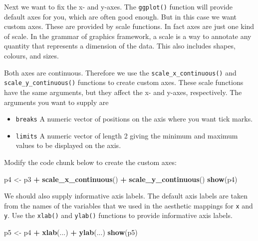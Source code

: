 \documentclass[
]{book}
\newenvironment{Shaded}{\begin{snugshade}}{\end{snugshade}}
\newcommand{\FunctionTok}[1]{\textcolor[rgb]{0.13,0.29,0.53}{\textbf{#1}}}
\newcommand{\NormalTok}[1]{#1}
\newcommand{\OtherTok}[1]{\textcolor[rgb]{0.56,0.35,0.01}{#1}}
\newcommand{\SpecialCharTok}[1]{\textcolor[rgb]{0.81,0.36,0.00}{\textbf{#1}}}
\providecommand{\tightlist}{%
  \setlength{\itemsep}{0pt}\setlength{\parskip}{0pt}}
\begin{document}
Next we want to fix the x- and y-axes. The \texttt{ggplot()} function will provide default axes for you, which are often good enough. But in this case we want custom axes. These are provided by scale functions. In fact axes are just one kind of scale. In the grammar of graphics framework, a scale is a way to annotate any quantity that represents a dimension of the data. This also includes shapes, colours, and sizes.

Both axes are continuous. Therefore we use the \texttt{scale\_x\_continuous()} and \texttt{scale\_y\_continuous()} functions to create custom axes. These scale functions have the same arguments, but they affect the x- and y-axes, respectively. The arguments you want to supply are

\begin{itemize}
\tightlist
\item
  \texttt{breaks} A numeric vector of positions on the axis where you want tick marks.
\item
  \texttt{limits} A numeric vector of length 2 giving the minimum and maximum values to be displayed on the axis.
\end{itemize}

Modify the code chunk below to create the custom axes:

\begin{Shaded}
\begin{Highlighting}[]
\NormalTok{p4 }\OtherTok{\textless{}{-}}\NormalTok{ p3 }\SpecialCharTok{+} \FunctionTok{scale\_x\_continuous}\NormalTok{() }\SpecialCharTok{+} \FunctionTok{scale\_y\_continuous}\NormalTok{()}
\FunctionTok{show}\NormalTok{(p4)}
\end{Highlighting}
\end{Shaded}

We should also supply informative axis labels. The default axis labels are taken from the names of the variables that we used in the aesthetic mappings for \texttt{x} and \texttt{y}. Use the \texttt{xlab()} and \texttt{ylab()} functions to provide informative axis labels.

\begin{Shaded}
\begin{Highlighting}[]
\NormalTok{p5 }\OtherTok{\textless{}{-}}\NormalTok{ p4 }\SpecialCharTok{+} \FunctionTok{xlab}\NormalTok{(...) }\SpecialCharTok{+} \FunctionTok{ylab}\NormalTok{(...)}
\FunctionTok{show}\NormalTok{(p5)}
\end{Highlighting}
\end{Shaded}
\end{document}
